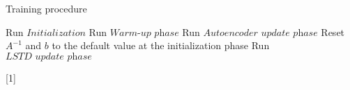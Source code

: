 \documentclass[a4paper,12pt,oneside]{article}
\numberwithin{equation}{section}
\begin{document}
    \clearpage
    \begin{algorithm}
        \caption{Training procedure}
        \begin{algorithmic}[1]
        \State Run \(Initialization\)
        \State Run \(\textit{Warm-up phase}\)
            \State Run \(\textit{Autoencoder update phase}\)
                \State Reset \(A^{-1}\) and \(b\) to the default value at the initialization phase 
            \EndIf
            \State Run \(\textit{LSTD update phase}\)
        \EndWhile
        \end{algorithmic}[1]    
    \end{algorithm}
    
    
\end{document}

